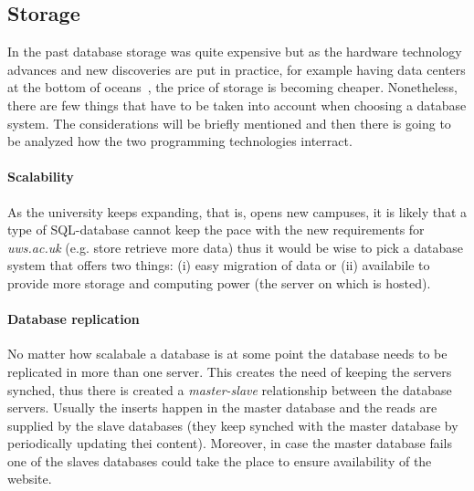 \documentclass[11]{article}
\begin{document}



	\subsection*{Storage}
		In the past database storage was quite expensive but as the hardware technology advances and new discoveries are put in practice, for example having data centers at the bottom of oceans~\citep{simon2018project}, the price of storage is becoming cheaper. Nonetheless, there are few things that have to be taken into account when choosing a database system. The considerations will be briefly mentioned and then there is going to be analyzed how the two programming technologies interract.

	\paragraph{Scalability\\}
	As the university keeps expanding, that is, opens new campuses, it is likely that a type of SQL-database cannot keep the pace with the new requirements for \textit{uws.ac.uk} (e.g. store  retrieve more data) thus it would be wise to pick a database system that offers two things: (i) easy migration of data or (ii) availabile to provide more storage and computing power (the server on which is hosted).

	\paragraph{Database replication\\}
	No matter how scalabale a database is at some point the database needs to be replicated in more than one server. This creates the need of keeping the servers synched, thus there is created a \textit{master-slave} relationship between the database servers. Usually the inserts happen in the master database and the reads are supplied by the slave databases (they keep synched with the master database by periodically updating thei content). Moreover, in case the master database fails one of the slaves databases could take the place to ensure availability of the website.
\end{document}
